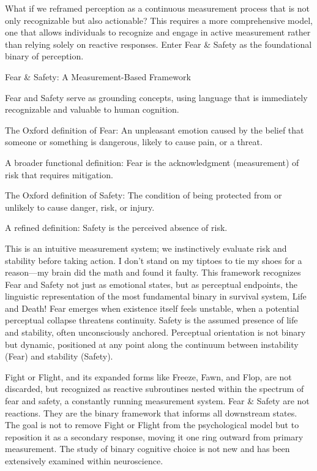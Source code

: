 \documentclass[11pt]{article}
\begin{document}
What if we reframed perception as a continuous measurement process that is not only recognizable but also actionable? This requires a more comprehensive model, one that allows individuals to recognize and engage in active measurement rather than relying solely on reactive responses. Enter Fear & Safety as the foundational binary of perception.

Fear & Safety: A Measurement-Based Framework

Fear and Safety serve as grounding concepts, using language that is immediately recognizable and valuable to human cognition.

The Oxford definition of Fear: An unpleasant emotion caused by the belief that someone or something is dangerous, likely to cause pain, or a threat.

A broader functional definition: Fear is the acknowledgment (measurement) of risk that requires mitigation.

The Oxford definition of Safety: The condition of being protected from or unlikely to cause danger, risk, or injury.

A refined definition: Safety is the perceived absence of risk.

This is an intuitive measurement system; we instinctively evaluate risk and stability before taking action. I don’t stand on my tiptoes to tie my shoes for a reason—my brain did the math and found it faulty. This framework recognizes Fear and Safety not just as emotional states, but as perceptual endpoints, the linguistic representation of the most fundamental binary in survival system, Life and Death! Fear emerges when existence itself feels unstable, when a potential perceptual collapse threatens continuity. Safety is the assumed presence of life and stability, often unconsciously anchored. Perceptual orientation is not binary but dynamic, positioned at any point along the continuum between instability (Fear) and stability (Safety).

Fight or Flight, and its expanded forms like Freeze, Fawn, and Flop, are not discarded, but recognized as reactive subroutines nested within the spectrum of fear and safety, a constantly running measurement system. Fear & Safety are not reactions. They are the binary framework that informs all downstream states. The goal is not to remove Fight or Flight from the psychological model but to reposition it as a secondary response, moving it one ring outward from primary measurement. The study of binary cognitive choice is not new and has been extensively examined within neuroscience.
\end{document}
